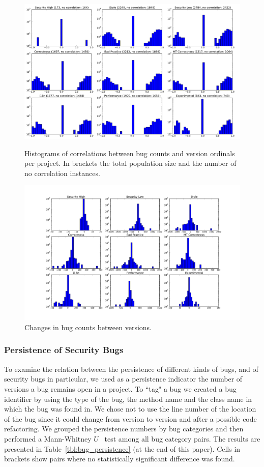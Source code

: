 \documentclass[letterpaper,twocolumn,10pt]{article}
\begin{document}
\begin{figure}[p]
  \centering
  \includegraphics[scale=0.30]{bugsversionscorr}
  \caption{Histograms of correlations between bug counts and version
    ordinals per project. In brackets the total population size and
    the number of no correlation instances.}
  \label{fig:bugsversionscorr}
  \centering
  \includegraphics[scale=0.35]{bugdiffs}
  \caption{Changes in bug counts between versions.}
  \label{fig:bugdiffs}
\end{figure}

\subsubsection{Persistence of Security Bugs}

To examine the relation between the persistence of different kinds of
bugs, and of security bugs in particular, we used as a persistence
indicator the number of versions a bug remains open in a project. To
``tag" a bug we created a bug identifier by using the type of the bug,
the method name and the class name in which the bug was found in. We
chose not to use the line number of the location of the bug since it
could change from version to version and after a possible code
refactoring. We grouped the persistence numbers by bug categories and
then performed a Mann-Whitney $U$~\cite{HM98} test among all bug
category pairs. The results are presented in
Table~\ref{tbl:bug_persistence} (at the end of this paper). Cells in
brackets show pairs where no statistically significant difference was
found.
\end{document}
